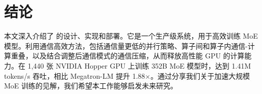 \section{结论}
\label{sec:conclusion}

本文深入介绍了 \sysname 的设计、实现和部署。它是一个生产级系统，用于高效训练 MoE 模型。\sysname 利用通信高效方法，包括通信量更低的并行策略、算子间和算子内通信-计算重叠，以及结合调整后通信模式的通信压缩，从而释放高性能 GPU 的计算能力。在 1,440 张 NVIDIA Hopper GPU 上训练 352B MoE 模型时，\sysname 达到 1.41M tokens/s 吞吐，相比 Megatron-LM 提升 1.88$\times$。通过分享我们关于加速大规模 MoE 训练的见解，我们希望本工作能够启发未来研究。

